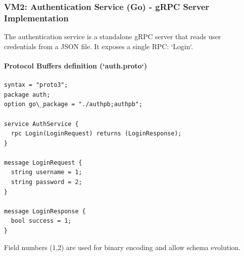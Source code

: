 \documentclass[a4paper]{article}
\begin{document}
\subsubsection{VM2: Authentication Service (Go) - gRPC Server Implementation}
The authentication service is a standalone gRPC server that reads user credentials from a JSON file. It exposes a single RPC: `Login`.

\paragraph{Protocol Buffers definition (`auth.proto`)}
\begin{lstlisting}
syntax = "proto3";
package auth;
option go\_package = "./authpb;authpb";

service AuthService {
  rpc Login(LoginRequest) returns (LoginResponse);
}

message LoginRequest {
  string username = 1;
  string password = 2;
}

message LoginResponse {
  bool success = 1;
}
\end{lstlisting}
Field numbers (1,2) are used for binary encoding and allow schema evolution.
\end{document}

